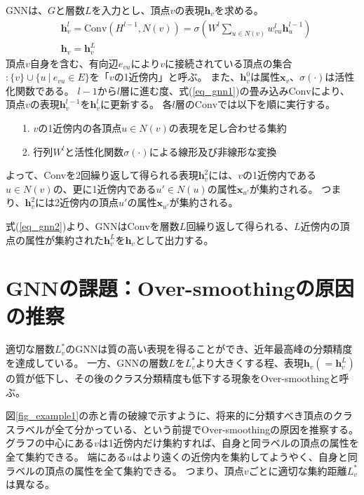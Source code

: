 \documentclass[a4j,twocolumn]{jsarticle}
\begin{document}
GNNは、$G$と層数$L$を入力とし、頂点$v$の表現$\bm{h}_v$を求める。\vspace{-6mm}
\begin{align}
  & \bm{h}_v^l = \text{Conv}(H^{l-1}, N(v)) = \sigma\left( W^l \sum_{u\in N(v)} w_{vu}^l\bm{h}_u^{l-1} \right) \label{eq_gnn1} \\
  & \bm{h}_v   = \bm{h}_v^L \label{eq_gnn2}
\end{align}
頂点$v$自身を含む、有向辺$e_{vu}$により$v$に接続されている頂点の集合$:\{v\} \cup \{u ~|~ e_{vu} \in E\}$を「$v$の1近傍内」と呼ぶ。
また、$\bm{h}_v^0$は属性$\bm{x}_v$、$\sigma(\cdot)$は活性化関数である。
$l-1$から$l$層に進む度、式(\ref{eq_gnn1})の畳み込み$\text{Conv}$により、頂点$v$の表現$\bm{h}_v^{l-1}$を$\bm{h}_v^{l}$に更新する。
各$l$層の$\text{Conv}$では以下を順に実行する。\vspace{-2mm}
\begin{itemize}
  \item[1.] $v$の1近傍内の各頂点$u\in N(v)$の表現を足し合わせる集約
  \item[2.] 行列$W^l$と活性化関数$\sigma(\cdot)$による線形及び非線形な変換\vspace{-2mm}
\end{itemize}
よって、Convを2回繰り返して得られる表現$\bm{h}_v^2$には、$v$の1近傍内である$u\in N(v)$の、更に1近傍内である$u' \in N(u)$の属性$\bm{x}_{u'}$が集約される。
つまり、$\bm{h}_v^2$には2近傍内の頂点$u'$の属性$\bm{x}_{u'}$が集約される。

式(\ref{eq_gnn2})より、GNNは$\text{Conv}$を層数$L$回繰り返して得られる、$L$近傍内の頂点の属性が集約された$\bm{h}_v^L$を$\bm{h}_v$として出力する。


\section{GNNの課題：Over-smoothingの原因の推察}
\label{sec_over_smoothing}

適切な層数$L_v^*$のGNNは質の高い表現を得ることができ、近年最高峰の分類精度を達成している\cite{Kipf}\cite{Velickovic}。
一方、GNNの層数$L$を$L_v^*$より大きくする程、表現$\bm{h}_v(=\bm{h}_v^L)$の質が低下し、その後のクラス分類精度も低下する現象をOver-smoothingと呼ぶ。

図\ref{fig_example1}の赤と青の破線で示すように、将来的に分類すべき頂点のクラスラベルが全て分かっている、という前提でOver-smoothingの原因を推察する。
グラフの中心にある$v$は1近傍内だけ集約すれば、自身と同ラベルの頂点の属性を全て集約できる。
端にある$u$はより遠くの近傍内を集約してようやく、自身と同ラベルの頂点の属性を全て集約できる。
つまり、頂点$v$ごとに適切な集約距離$L_v^*$は異なる。
\end{document}
